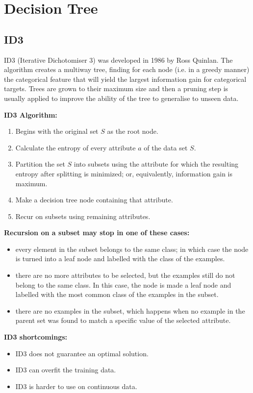 \documentclass[a4paper, 11pt]{article}
\begin{document}
\section{Decision Tree}

\subsection{ID3}
ID3 (Iterative Dichotomiser 3) was developed in 1986 by Ross Quinlan. The algorithm creates a multiway tree, finding for each node (i.e. in a greedy manner) the categorical feature that will yield the largest information gain for categorical targets. Trees are grown to their maximum size and then a pruning step is usually applied to improve the ability of the tree to generalise to unseen data.

\textbf{ID3 Algorithm:}
\begin{enumerate}
	\item Begins with the original set $S$ as the root node.
	\item Calculate the entropy of every attribute $a$ of the data set $S$.
	\item Partition the set $S$ into subsets using the attribute for which the resulting entropy after splitting is minimized; or, equivalently, information gain is maximum.
	\item Make a decision tree node containing that attribute.
	\item Recur on subsets using remaining attributes.
\end{enumerate}

\textbf{Recursion on a subset may stop in one of these cases:}
\begin{itemize}
	\item every element in the subset belongs to the same class; in which case the node is turned into a leaf node and labelled with the class of the examples.
	\item there are no more attributes to be selected, but the examples still do not belong to the same class. In this case, the node is made a leaf node and labelled with the most common class of the examples in the subset.
	\item there are no examples in the subset, which happens when no example in the parent set was found to match a specific value of the selected attribute. 
\end{itemize}

\textbf{ID3 shortcomings:}
\begin{itemize}
	\item ID3 does not guarantee an optimal solution. 
	\item ID3 can overfit the training data. 
	\item ID3 is harder to use on continuous data.
\end{itemize}
\end{document}

